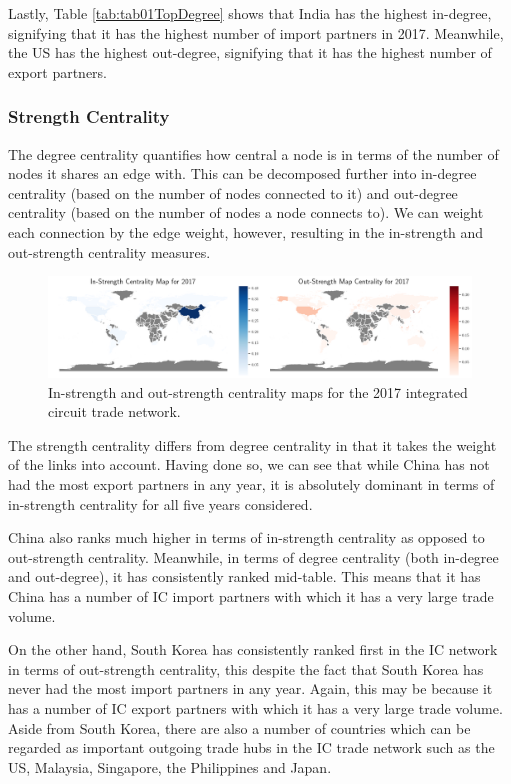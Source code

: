 \documentclass[12pt,letterpaper]{report}
\begin{document}
			Lastly, Table \ref{tab:tab01TopDegree} shows that India has the highest in-degree, signifying that it has the highest number of import partners in 2017. Meanwhile, the US has the highest out-degree, signifying that it has the highest number of export partners. 
			
			\subsubsection{Strength Centrality}
			\label{ssec:5222strength}
			
			The degree centrality quantifies how central a node is in terms of the number of nodes it shares an edge with. This can be decomposed further into in-degree centrality (based on the number of nodes connected to it) and out-degree centrality (based on the number of nodes a node connects to). We can weight each connection by the edge weight, however, resulting in the in-strength and out-strength centrality measures.
			
			\begin{figure}[!h]
				\centering
				\includegraphics[width=\textwidth]{Fig507-StrengthMap.png}
				\caption{In-strength and out-strength centrality maps for the 2017 integrated circuit trade network.}\label{fig:507StrengthMap}
			\end{figure}
			
			The strength centrality differs from degree centrality in that it takes the weight of the links into account. Having done so, we can see that while China has not had the most export partners in any year, it is absolutely dominant in terms of in-strength centrality for all five years considered.
			
			China also ranks much higher in terms of in-strength centrality as opposed to out-strength centrality. Meanwhile, in terms of degree centrality (both in-degree and out-degree), it has consistently ranked mid-table. This means that it has China has a number of IC import partners with which it has a very large trade volume.  
			
			On the other hand, South Korea has consistently ranked first in the IC network in terms of out-strength centrality, this despite the fact that South Korea has never had the most import partners in any year. Again, this may be because it has a number of IC export partners with which it has a very large trade volume. Aside from South Korea, there are also a number of countries which can be regarded as important outgoing trade hubs in the IC trade network such as the US, Malaysia, Singapore, the Philippines and Japan.
		
\end{document}
